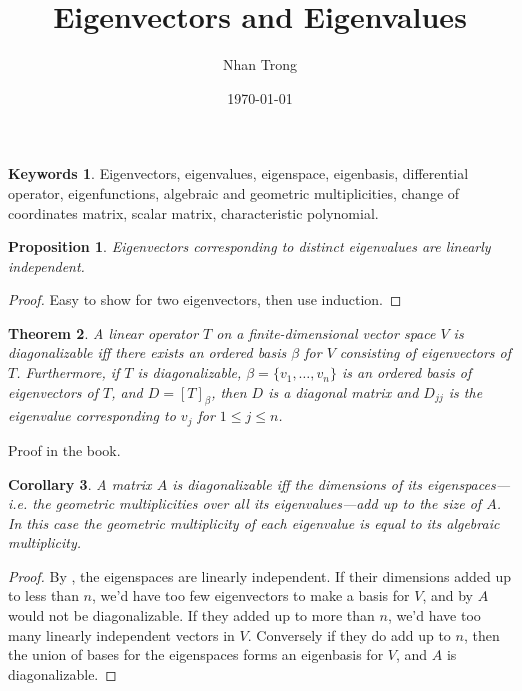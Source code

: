 \documentclass[12pt]{article}
\title{Eigenvectors and Eigenvalues}
\author{Nhan Trong}
\date{\today}                                           %
\theoremstyle{plain}
\newtheorem{theorem}{Theorem}
\newtheorem{corollary}[theorem]{Corollary}
\newtheorem{proposition}[theorem]{Proposition}
\theoremstyle{definition}
\newtheorem*{keywords}{Keywords}
\theoremstyle{remark}
\begin{document}
\maketitle

\begin{keywords}
Eigenvectors, eigenvalues, eigenspace, eigenbasis, differential operator, eigenfunctions, algebraic and geometric multiplicities, change of coordinates matrix, scalar matrix, characteristic polynomial.
\end{keywords}

\begin{proposition}\label{eigenindependence}
Eigenvectors corresponding to distinct eigenvalues are linearly independent.
\end{proposition}

\begin{proof}
Easy to show for two eigenvectors, then use induction.
\end{proof}

\begin{theorem}\label{diagonalizable}
A linear operator $T$ on a finite-dimensional vector space $V$ is diagonalizable iff there exists an ordered basis $\beta$ for $V$ consisting of eigenvectors of $T$. Furthermore, if $T$ is diagonalizable, $\beta = \{v_1,\ldots, v_n\}$ is an ordered basis of eigenvectors of $T$, and $D = [T]_\beta$, then $D$ is a diagonal matrix and $D_{jj}$ is the eigenvalue corresponding to $v_j$ for $1 \leq j \leq n$.
\end{theorem}

Proof in the book.

\begin{corollary}
A matrix $A$ is diagonalizable iff the dimensions of its eigenspaces---i.e. the geometric multiplicities over all its eigenvalues---add up to the size of $A$. In this case the geometric multiplicity of each eigenvalue is equal to its algebraic multiplicity.
\end{corollary}

\begin{proof}
By , the eigenspaces are linearly independent. If their dimensions added up to less than $n$, we'd have too few eigenvectors to make a basis for $V$, and by  $A$ would not be diagonalizable. If they added up to more than $n$, we'd have too many linearly independent vectors in $V$. Conversely if they do add up to $n$, then the union of bases for the eigenspaces forms an eigenbasis for $V$, and $A$ is diagonalizable. 
\end{proof}
\end{document}

